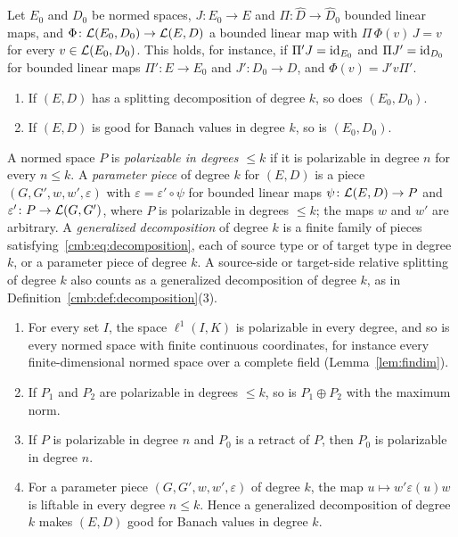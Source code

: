 \begin{lemma}\label{cmb:lem:subpair}
Let $E_0$ and $D_0$ be normed spaces, $J\colon E_0\to E$ and $\Pi\colon\widehat D\to\widehat D_0$ bounded linear maps,
and $\Phi\colon\mathcal L(E_0,D_0)\to\mathcal L(E,D)$ a bounded linear map with $\Pi\,\Phi(v)\,J=v$ for every $v\in\mathcal L(E_0,D_0)$. This
holds, for instance, if $\Pi'J=\mathrm{id}_{E_0}$ and $\Pi J'=\mathrm{id}_{D_0}$ for bounded linear maps $\Pi'\colon E\to E_0$ and
$J'\colon D_0\to D$, and $\Phi(v)=J'v\Pi'$.
\begin{enumerate}
\item If $(E,D)$ has a splitting decomposition of degree $k$, so does $(E_0,D_0)$.
\item If $(E,D)$ is good for Banach values in degree $k$, so is $(E_0,D_0)$.
\end{enumerate}
\end{lemma}

\begin{definition}\label{cmb:def:parameter-piece}
A normed space $P$ is \emph{polarizable in degrees $\le k$} if it is polarizable in degree $n$ for every $n\le k$. A
\emph{parameter piece} of degree $k$ for $(E,D)$ is a piece $(G,G',w,w',\varepsilon)$ with $\varepsilon=\varepsilon'\circ\psi$
for bounded linear maps $\psi\colon\mathcal L(E,D)\to P$ and $\varepsilon'\colon P\to\mathcal L(G,G')$, where $P$ is polarizable in
degrees $\le k$; the maps $w$ and $w'$ are arbitrary. A \emph{generalized decomposition} of degree $k$ is a finite family
of pieces satisfying~\eqref{cmb:eq:decomposition}, each of source type or of target type in degree $k$, or a parameter
piece of degree $k$. A source-side or target-side relative splitting of degree $k$ also counts as a generalized
decomposition of degree $k$, as in Definition~\ref{cmb:def:decomposition}(3).
\end{definition}

\begin{proposition}\label{cmb:prop:parameter-pieces}
\begin{enumerate}
\item For every set $I$, the space $\ell^1(I,K)$ is polarizable in every degree, and so is every normed space with finite
continuous coordinates, for instance every finite-dimensional normed space over a complete field
(Lemma~\ref{lem:findim}).
\item If $P_1$ and $P_2$ are polarizable in degrees $\le k$, so is $P_1\oplus P_2$ with the maximum norm.
\item If $P$ is polarizable in degree $n$ and $P_0$ is a retract of $P$, then $P_0$ is polarizable in degree $n$.
\item For a parameter piece $(G,G',w,w',\varepsilon)$ of degree $k$, the map $u\mapsto w'\varepsilon(u)w$ is liftable in
every degree $n\le k$. Hence a generalized decomposition of degree $k$ makes $(E,D)$ good for Banach values in degree
$k$.
\end{enumerate}
\end{proposition}

